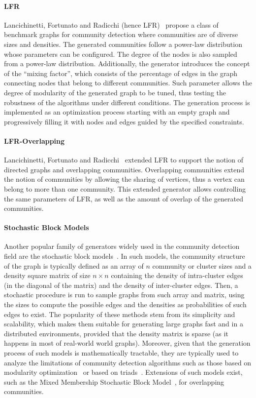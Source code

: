 \paragraph{LFR} Lancichinetti, Fortunato
and Radicchi (hence LFR)~\cite{PhysRevE.78.046110} propose a class of benchmark
graphs for community detection where communities are of diverse sizes and
densities. The generated communities follow a power-law distribution whose parameters can be configured. The degree of the
nodes is also sampled from a power-law distribution. Additionally, the generator
introduces the concept of the ``mixing factor'', which consists of the percentage of
edges in the graph connecting nodes that belong to different communities. Such parameter
allows  the degree of modularity of the generated graph  to be tuned, thus
testing the robustness of the algorithms under different conditions. The
generation process is implemented as an optimization process starting with an empty graph and
progressively filling it with nodes and edges guided by the specified constraints.

\paragraph{LFR-Overlapping} Lancichinetti, Fortunato and
Radicchi~\cite{PhysRevE.80.016118} extended LFR to support the notion of
directed graphs and overlapping communities. Overlapping communities extend the
notion of communities by allowing the sharing of vertices, thus a vertex can
belong to more than one community. This extended generator allows controlling
the same parameters of LFR, as well as the amount of overlap of
the generated communities.

\paragraph{Stochastic Block Models} Another popular family of generators
widely used in the community detection field are the stochastic block
models~\cite{holland1983stochastic}. In such models, the community structure of
the graph is typically defined as an array of $n$ community or cluster sizes
and a density square matrix of size $n \times n$ containing the density of
intra-cluster edges (in the diagonal of the matrix) and the density of
inter-cluster edges. Then, a stochastic procedure is run to sample graphs
from such array and matrix, using the sizes to compute the possible edges
and the densities as probabilities of such edges to exist. The popularity of
these methods stem from its simplicity and scalability, which makes them
suitable for generating large graphs fast and in a distributed environments,
provided that the density matrix is sparse (as it happens in most of real-world
                                            world graphs). Moreover, given
that the generation process of such models is mathematically tractable, they
are typically used to analyze the limitations of community detection
algorithms such as those based on modularity
optimization~\cite{fortunato2007resolution} or based on
triads~\cite{prat2016put}. Extensions of such models exist, such as the
Mixed Membership Stochastic Block Model~\cite{airoldi2008mixed}, for
overlapping communities.

